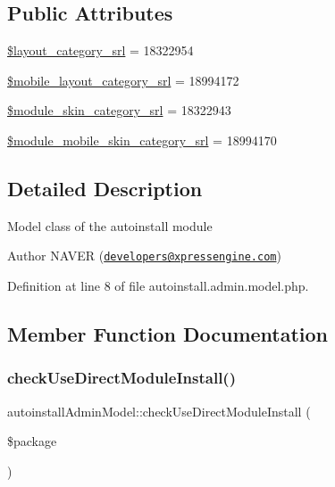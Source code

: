 \subsection*{Public Attributes}
\begin{DoxyCompactItemize}
\item 
\hyperlink{classautoinstallAdminModel_ae52a3948ebafbec737741c8bb5a51f68}{\$layout\+\_\+category\+\_\+srl} = 18322954
\item 
\hyperlink{classautoinstallAdminModel_a7dca62f2e0f3e37c6f2562125cd8cf94}{\$mobile\+\_\+layout\+\_\+category\+\_\+srl} = 18994172
\item 
\hyperlink{classautoinstallAdminModel_ad9e023f5b4f464ba2cbea5465d05ef69}{\$module\+\_\+skin\+\_\+category\+\_\+srl} = 18322943
\item 
\hyperlink{classautoinstallAdminModel_add26efaa0308b61db15daa951bef678f}{\$module\+\_\+mobile\+\_\+skin\+\_\+category\+\_\+srl} = 18994170
\end{DoxyCompactItemize}


\subsection{Detailed Description}
Model class of the autoinstall module \begin{DoxyAuthor}{Author}
N\+A\+V\+ER (\href{mailto:developers@xpressengine.com}{\tt developers@xpressengine.\+com}) 
\end{DoxyAuthor}


Definition at line 8 of file autoinstall.\+admin.\+model.\+php.



\subsection{Member Function Documentation}
\mbox{\label{classautoinstallAdminModel_a899c3f3182e6c80b28f0aabc261bf38c}} 
\subsubsection{\texorpdfstring{check\+Use\+Direct\+Module\+Install()}{checkUseDirectModuleInstall()}}
{\footnotesize\ttfamily autoinstall\+Admin\+Model\+::check\+Use\+Direct\+Module\+Install (\begin{DoxyParamCaption}\item[{}]{\$package }\end{DoxyParamCaption})}



